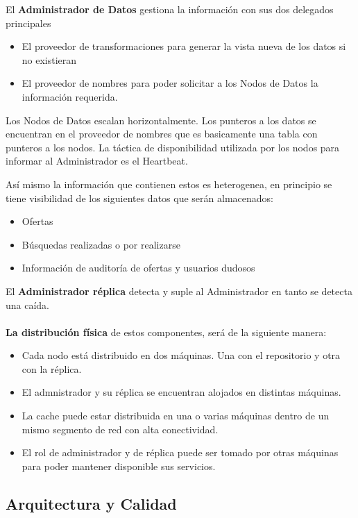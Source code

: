 El \textbf{Administrador de Datos} gestiona la informaci\'on con sus dos delegados principales
\begin{itemize}
    \item El proveedor de transformaciones para generar la vista nueva de los datos si no existieran 
    \item El proveedor de nombres para poder solicitar a los Nodos de Datos la informaci\'on requerida. 

\end{itemize}


Los Nodos de Datos escalan horizontalmente. Los punteros a los datos se encuentran en el proveedor de nombres que es basicamente una tabla con punteros a los nodos. La t\'actica de  disponibilidad utilizada por los nodos para informar al Administrador es el Heartbeat.

As\'i mismo la informaci\'on que contienen estos es heterogenea, en principio se tiene visibilidad de los siguientes datos que ser\'an almacenados:
\begin{itemize}
    \item Ofertas
    \item B\'usquedas realizadas o por realizarse
    \item Informaci\'on de auditor\'ia de ofertas y usuarios dudosos
\end{itemize}


El \textbf{Administrador r\'eplica} detecta y suple al Administrador en tanto se detecta una ca\'ida.
\\
\\

\textbf{La distribuci\'on f\'isica} de estos componentes, ser\'a de la siguiente manera:

\begin{itemize}
    \item Cada nodo est\'a distribuido en dos m\'aquinas. Una con el repositorio y otra con la r\'eplica.
    \item El admnistrador y su r\'eplica se encuentran alojados en distintas m\'aquinas.
    \item La cache puede estar distribuida en una o varias m\'aquinas dentro de un mismo segmento de red con alta conectividad.
    \item El rol de administrador y de r\'eplica  puede ser tomado por otras m\'aquinas para poder mantener disponible sus servicios.
\end{itemize}


\subsection*{Arquitectura y Calidad}

